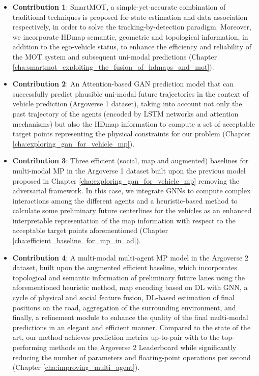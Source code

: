 \begin{itemize}
	
	\item \textbf{Contribution 1}: SmartMOT, a simple-yet-accurate combination of traditional techniques is proposed for state estimation and data association respectively, in order to solve the tracking-by-detection paradigm. Moreover, we incorporate \ac{HDmap} semantic, geometric and topological information, in addition to the ego-vehicle status, to enhance the efficiency and reliability of the \ac{MOT} system and subsequent uni-modal predictions (Chapter \ref{cha:smartmot_exploiting_the_fusion_of_hdmaps_and_mot}).
	
	\item \textbf{Contribution 2}: An Attention-based \ac{GAN} prediction model that can successfully predict plausible uni-modal future trajectories in the context of vehicle prediction (Argoverse 1 dataset), taking into account not only the past trajectory of the agents (encoded by \ac{LSTM} networks and attention mechanisms) but also the \ac{HDmap} information to compute a set of acceptable target points representing the physical constraints for our problem (Chapter \ref{cha:exploring_gan_for_vehicle_mp}).
	
	\item \textbf{Contribution 3}: Three efficient (social, map and augmented) baselines for multi-modal \ac{MP} in the Argoverse 1 dataset built upon the previous model proposed in Chapter \ref{cha:exploring_gan_for_vehicle_mp} removing the adversarial framework. In this case, we integrate \acp{GNN} to compute complex interactions among the different agents and a heuristic-based method to calculate some preliminary future centerlines for the vehicles as an enhanced interpretable representation of the map information with respect to the acceptable target points aforementioned (Chapter \ref{cha:efficient_baseline_for_mp_in_ad}). 
	
	\item \textbf{Contribution 4}: A multi-modal multi-agent \ac{MP} model in the Argoverse 2 dataset, built upon the augmented efficient baseline, which incorporates topological and semantic information of preliminary future lanes using the aforementioned heuristic method, map encoding based on \ac{DL} with \ac{GNN}, a cycle of physical and social feature fusion, \ac{DL}-based estimation of final positions on the road, aggregation of the surrounding environment, and finally, a refinement module to enhance the quality of the final multi-modal predictions in an elegant and efficient manner. Compared to the state of the art, our method achieves prediction metrics up-to-pair with to the top-performing methods on the Argoverse 2 Leaderboard while significantly reducing the number of parameters and floating-point operations per second (Chapter \ref{cha:improving_multi_agent}).
	

\end{itemize}
